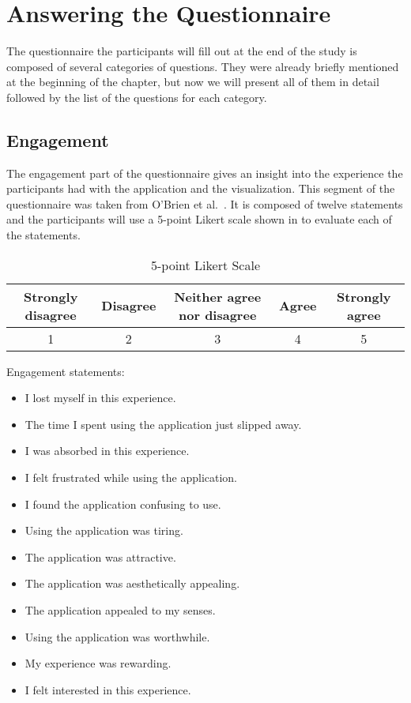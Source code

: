 \section{Answering the Questionnaire}\label{sec:answering-questionnaire}
The questionnaire the participants will fill out at the end of the study is composed of several categories of questions. They were already briefly
mentioned at the beginning of the chapter, but now we will present all of them in detail followed by the list of the questions for each category.

\subsection{Engagement}\label{subsec:questionnaire-engagement}
The engagement part of the questionnaire gives an insight into the experience the participants had with the application and the visualization. This
segment of the questionnaire was taken from O’Brien et al.~\citep{o2018practical}. It is composed of twelve statements and the participants will
use a 5-point Likert scale shown in  to evaluate each of the statements.

\vspace{0.5cm}

\begin{table}[ht]
    \begin{center}
        \begin{tabular}{ccccc}
            \hline
            Strongly disagree & Disagree & Neither agree nor disagree & Agree & Strongly agree\\ \hline
            1 & 2 & 3 & 4 & 5\\ \hline
        \end{tabular}
    \end{center}
    \caption{5-point Likert Scale}
    \label{tab:engagement-scoring-scale}
\end{table}

\clearpage

Engagement statements:
\begin{itemize}
    \item I lost myself in this experience.
    \item The time I spent using the application just slipped away.
    \item I was absorbed in this experience.
    \item I felt frustrated while using the application.
    \item I found the application confusing to use.
    \item Using the application was tiring.
    \item The application was attractive.
    \item The application was aesthetically appealing.
    \item The application appealed to my senses.
    \item Using the application was worthwhile.
    \item My experience was rewarding.
    \item I felt interested in this experience.
\end{itemize}

